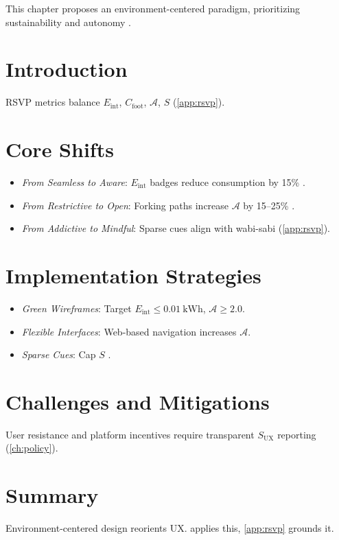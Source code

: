 \documentclass[openany]{book}
\newcommand{\Sent}{S} %
\newcommand{\Eint}{E_{\mathrm{int}}} %
\newcommand{\Cfoot}{C_{\mathrm{foot}}} %
\newcommand{\Auton}{\mathcal{A}} %
\newcommand{\SUX}{S_{\mathrm{UX}}} %
\newcommand{\kWh}{\mathrm{kWh}}
\begin{document}
{{This chapter proposes an environment-centered paradigm, prioritizing sustainability and autonomy \citep{colak2024,doctorow2022}.

\section{Introduction}
\label{sec:paradigm-intro}
RSVP metrics balance \(\Eint\), \(\Cfoot\), \(\Auton\), \(\Sent\) (\cref{app:rsvp}).

\section{Core Shifts}
\label{sec:paradigm-shifts}
\begin{itemize}
  \item \emph{From Seamless to Aware}: \(\Eint\) badges reduce consumption by 15\% \citep{colak2024}.
  \item \emph{From Restrictive to Open}: Forking paths increase \(\Auton\) by 15--25\% \citep{doctorow2022}.
  \item \emph{From Addictive to Mindful}: Sparse cues align with wabi-sabi (\cref{app:rsvp}).
\end{itemize}

\section{Implementation Strategies}
\label{sec:paradigm-strategies}
\begin{itemize}
  \item \emph{Green Wireframes}: Target \(\Eint \leq \SI{0.01}{\kWh}\), \(\Auton \geq 2.0\).
  \item \emph{Flexible Interfaces}: Web-based navigation increases \(\Auton\).
  \item \emph{Sparse Cues}: Cap \(\Sent\) \citep{colak2024}.
\end{itemize}

\section{Challenges and Mitigations}
\label{sec:paradigm-challenges}
User resistance and platform incentives require transparent \(\SUX\) reporting (\cref{ch:policy}).

\section{Summary}
Environment-centered design reorients UX.  applies this, \cref{app:rsvp} grounds it.

}}
\end{document}
